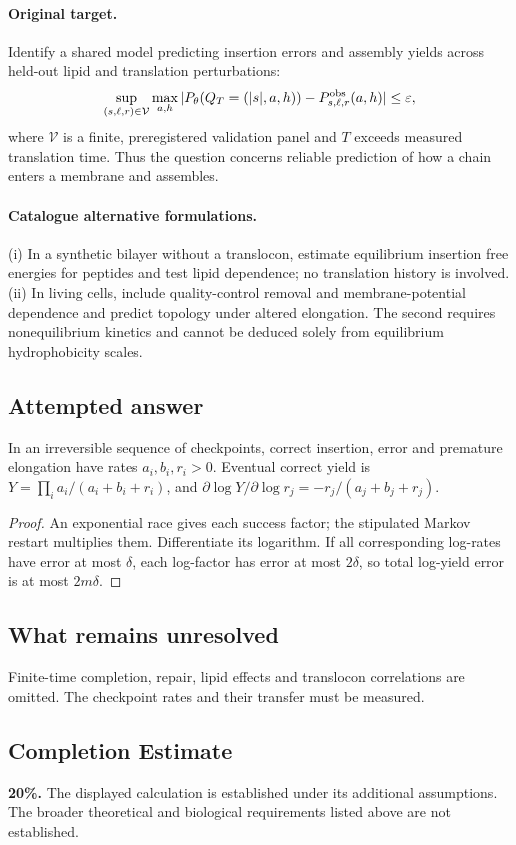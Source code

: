 \documentclass[11pt]{article}
\begin{document}
\paragraph{Original target.}
Identify a shared model predicting insertion errors and assembly yields across held-out lipid and translation perturbations:
\[
\sup_{(s,\ell,r)\in\mathcal V}\max_{a,h}
|P_\theta(Q_T=(|s|,a,h))-P^{\rm obs}_{s,\ell,r}(a,h)|\leq\varepsilon,
\]
where $\mathcal V$ is a finite, preregistered validation panel and $T$ exceeds measured translation time. Thus the question concerns reliable prediction of how a chain enters a membrane and assembles.
\paragraph{Catalogue alternative formulations.}
(i) In a synthetic bilayer without a translocon, estimate equilibrium insertion free energies for peptides and test lipid dependence; no translation history is involved. (ii) In living cells, include quality-control removal and membrane-potential dependence and predict topology under altered elongation. The second requires nonequilibrium kinetics and cannot be deduced solely from equilibrium hydrophobicity scales.
\subsection{Attempted answer}
\begin{proposition}
In an irreversible sequence of checkpoints, correct insertion, error and premature elongation have rates $a_i,b_i,r_i>0$. Eventual correct yield is $Y=\prod_i a_i/(a_i+b_i+r_i)$, and $\partial\log Y/\partial\log r_j=-r_j/(a_j+b_j+r_j)$.
\end{proposition}
\begin{proof}
An exponential race gives each success factor; the stipulated Markov restart multiplies them. Differentiate its logarithm. If all corresponding log-rates have error at most $\delta$, each log-factor has error at most $2\delta$, so total log-yield error is at most $2m\delta$.
\end{proof}
\subsection{What remains unresolved}
Finite-time completion, repair, lipid effects and translocon correlations are omitted. The checkpoint rates and their transfer must be measured.
\subsection{Completion Estimate}
\textbf{20\%.} The displayed calculation is established under its additional assumptions. The broader theoretical and biological requirements listed above are not established.
\end{document}
